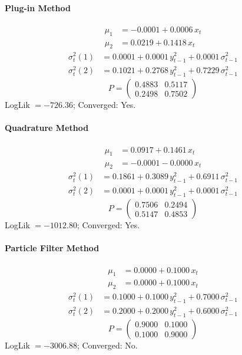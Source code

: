 \documentclass[11pt, a4paper]{article}
\begin{document}
\paragraph{Plug-in Method}
\begin{align}
\mu_{1} &= -0.0001 + 0.0006\, x_t \\
\mu_{2} &= 0.0219 + 0.1418\, x_t
\end{align}
\begin{align}
\sigma^2_{t}(1) &= 0.0001 + 0.0001\, y_{t-1}^2 + 0.0001\, \sigma^2_{t-1} \\
\sigma^2_{t}(2) &= 0.1021 + 0.2768\, y_{t-1}^2 + 0.7229\, \sigma^2_{t-1}
\end{align}
\begin{equation}
P = \begin{pmatrix} 0.4883 & 0.5117 \\ 0.2498 & 0.7502 \end{pmatrix}
\end{equation}
LogLik $= -726.36$; Converged: Yes.

\paragraph{Quadrature Method}
\begin{align}
\mu_{1} &= 0.0917 + 0.1461\, x_t \\
\mu_{2} &= -0.0001 -0.0000\, x_t
\end{align}
\begin{align}
\sigma^2_{t}(1) &= 0.1861 + 0.3089\, y_{t-1}^2 + 0.6911\, \sigma^2_{t-1} \\
\sigma^2_{t}(2) &= 0.0001 + 0.0001\, y_{t-1}^2 + 0.0001\, \sigma^2_{t-1}
\end{align}
\begin{equation}
P = \begin{pmatrix} 0.7506 & 0.2494 \\ 0.5147 & 0.4853 \end{pmatrix}
\end{equation}
LogLik $= -1012.80$; Converged: Yes.

\paragraph{Particle Filter Method}
\begin{align}
\mu_{1} &= 0.0000 + 0.1000\, x_t \\
\mu_{2} &= 0.0000 + 0.1000\, x_t
\end{align}
\begin{align}
\sigma^2_{t}(1) &= 0.1000 + 0.1000\, y_{t-1}^2 + 0.7000\, \sigma^2_{t-1} \\
\sigma^2_{t}(2) &= 0.2000 + 0.2000\, y_{t-1}^2 + 0.6000\, \sigma^2_{t-1}
\end{align}
\begin{equation}
P = \begin{pmatrix} 0.9000 & 0.1000 \\ 0.1000 & 0.9000 \end{pmatrix}
\end{equation}
LogLik $= -3006.88$; Converged: No.
\end{document}
